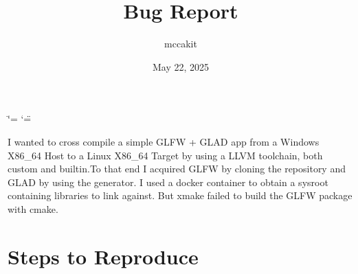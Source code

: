 \documentclass[a4paper,11pt,openany,oneside,english]{sphinxmanual}
\title{Bug Report}
\date{May 22, 2025}
\author{mccakit}
\begin{document}
\ifdefined\shorthandoff
  \ifnum\catcode`\=\string=\active\shorthandoff{=}\fi
  \ifnum\catcode`\"=\active{}\fi
\fi

\pagestyle{empty}
\sphinxmaketitle
\pagestyle{plain}
\sphinxtableofcontents
\pagestyle{normal}
\label{\detokenize{index::doc}}


\sphinxAtStartPar
I wanted to cross compile a simple GLFW + GLAD app from a Windows X86\_64
Host to a Linux X86\_64 Target by using a LLVM toolchain, both custom and
builtin.To that end I acquired GLFW by cloning the repository and GLAD
by using the generator. I used a docker container to obtain a sysroot
containing libraries to link against. But xmake failed to build the GLFW
package with cmake.


\chapter{Steps to Reproduce}
\end{document}
